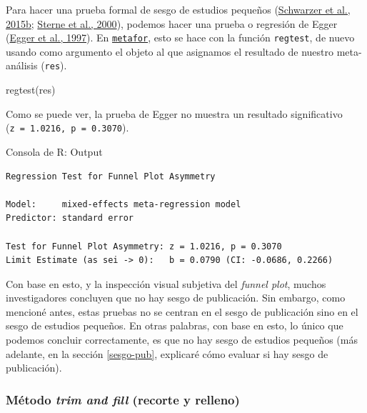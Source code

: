 \documentclass[
  bookmarksnumbered]{article}
\newenvironment{Shaded}{\begin{snugshade}}{\end{snugshade}}
\newcommand{\FunctionTok}[1]{\textcolor[rgb]{0.39,0.29,0.61}{#1}}
\newcommand{\NormalTok}[1]{\textcolor[rgb]{0.12,0.11,0.11}{#1}}
\begin{document}
Para hacer una prueba formal de sesgo de estudios pequeños (\protect\hyperlink{ref-schwarzerSmallStudyEffectsMetaAnalysis2015}{Schwarzer et al., 2015b}; \protect\hyperlink{ref-sternePublicationRelatedBias2000}{Sterne et al., 2000}), podemos hacer una prueba o regresión de Egger (\protect\hyperlink{ref-eggerBiasMetaanalysisDetected1997}{Egger et al., 1997}). En \href{https://www.metafor-project.org/doku.php}{\texttt{metafor}}, esto se hace con la función \texttt{regtest}, de nuevo usando como argumento el objeto al que asignamos el resultado de nuestro meta-análisis (\texttt{res}).

\begin{Shaded}
\begin{Highlighting}[]
\FunctionTok{regtest}\NormalTok{(res)}
\end{Highlighting}
\end{Shaded}

Como se puede ver, la prueba de Egger no muestra un resultado significativo (\texttt{z\ =\ 1.0216,\ p\ =\ 0.3070}).

\begin{ROut}{Consola de R: Output~\thetcbcounter}
                \begin{footnotesize}
                \begin{verbatim} 
Regression Test for Funnel Plot Asymmetry

Model:     mixed-effects meta-regression model
Predictor: standard error

Test for Funnel Plot Asymmetry: z = 1.0216, p = 0.3070
Limit Estimate (as sei -> 0):   b = 0.0790 (CI: -0.0686, 0.2266)
 \end{verbatim}
                \end{footnotesize}
                \end{ROut}

Con base en esto, y la inspección visual subjetiva del \emph{funnel plot}, muchos investigadores concluyen que no hay sesgo de publicación. Sin embargo, como mencioné antes, estas pruebas no se centran en el sesgo de publicación sino en el sesgo de estudios pequeños. En otras palabras, con base en esto, lo único que podemos concluir correctamente, es que no hay sesgo de estudios pequeños (más adelante, en la sección \ref{sesgo-pub}, explicaré cómo evaluar si hay sesgo de publicación).

\hypertarget{muxe9todo-trim-and-fill-recorte-y-relleno}{%
\subsubsection{\texorpdfstring{Método \emph{trim and fill} (recorte y relleno)}{Método trim and fill (recorte y relleno)}}\label{muxe9todo-trim-and-fill-recorte-y-relleno}}
\end{document}
